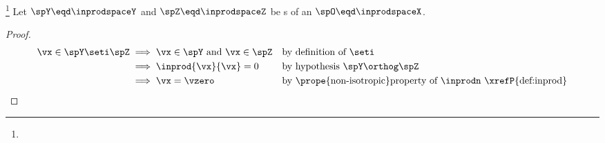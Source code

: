 \begin{theorem}
\footnote{
  }
\label{thm:YoZ==>YZ0}
Let $\spY\eqd\inprodspaceY$ and $\spZ\eqd\inprodspaceZ$ be s 
of an  $\spO\eqd\inprodspaceX$.
\thmbox{
  \spY \orthog \spZ 
  \qquad\implies\qquad
  \setY\seti\setZ=\setn{\vzero}
  }
\end{theorem}
\begin{proof}
\begin{align*}
  \vx\in\spY\seti\spZ
    & \implies \vx\in\spY \text{ and } \vx\in\spZ
    && \text{by definition of $\seti$}
  \\& \implies \inprod{\vx}{\vx}=0
    && \text{by hypothesis $\spY\orthog\spZ$}
  \\& \implies \vx=\vzero
    && \text{by \prope{non-isotropic}property of $\inprodn$ \xrefP{def:inprod}}
\end{align*}
\end{proof}

